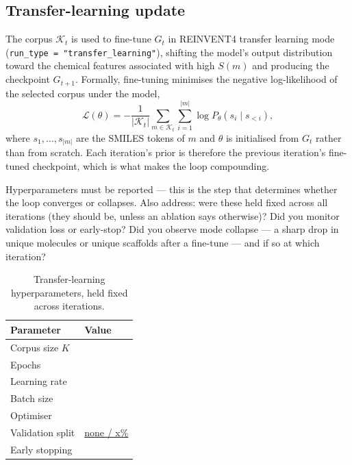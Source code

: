 \documentclass[11pt]{article}
\newcommand{\FILL}[1]{\textcolor{blue!65!black}{\underline{\textsf{#1}}}}
\newcommand{\Gmodel}{G}                         %
\newcommand{\TopK}{\mathcal{K}}                 %
\newcommand{\Kk}{K}
\begin{document}
\subsection{Transfer-learning update}
\label{sec:methods:tl}

The corpus $\TopK_t$ is used to fine-tune $\Gmodel_t$ in REINVENT4 transfer
learning mode (\texttt{run\_type = "transfer\_learning"}), shifting the model's
output distribution toward the chemical features associated with high $S(m)$
and producing the checkpoint $\Gmodel_{t+1}$. Formally, fine-tuning minimises
the negative log-likelihood of the selected corpus under the model,
\begin{equation}
  \mathcal{L}(\theta)
  = -\frac{1}{|\TopK_t|}
    \sum_{m \in \TopK_t} \sum_{i=1}^{|m|}
      \log P_\theta\!\left(s_i \mid s_{<i}\right),
  \label{eq:tlloss}
\end{equation}
where $s_1,\dots,s_{|m|}$ are the SMILES tokens of $m$ and $\theta$ is
initialised from $\Gmodel_t$ rather than from scratch. Each iteration's prior is
therefore the previous iteration's fine-tuned checkpoint, which is what makes
the loop compounding.

\begin{yourturn}
Hyperparameters must be reported --- this is the step that determines whether
the loop converges or collapses. Also address: were these held fixed across all
iterations (they should be, unless an ablation says otherwise)? Did you monitor
validation loss or early-stop? Did you observe mode collapse --- a sharp drop in
unique molecules or unique scaffolds after a fine-tune --- and if so at which
iteration?
\end{yourturn}

\begin{table}[h]
\centering
\caption{Transfer-learning hyperparameters, held fixed across iterations.}
\label{tab:tlconfig}
\small
\begin{tabular}{ll}
\toprule
Parameter & Value \\
\midrule
Corpus size $\Kk$              & \FILL{} \\
Epochs                         & \FILL{} \\
Learning rate                  & \FILL{} \\
Batch size                     & \FILL{} \\
Optimiser                      & \FILL{} \\
Validation split               & \FILL{none / x\%} \\
Early stopping                 & \FILL{} \\
\bottomrule
\end{tabular}
\end{table}
\end{document}
